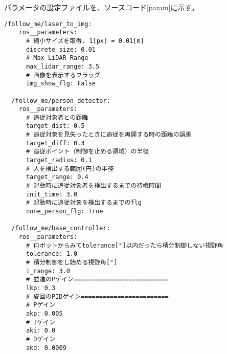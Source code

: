 パラメータの設定ファイルを、ソースコード\ref{param}に示す。
\begin{lstlisting}[caption=follow\_me\_params.yaml, label=param]
  /follow_me/laser_to_img:
    ros__parameters:
      # 縮小サイズを取得. 1[px] = 0.01[m]
      discrete_size: 0.01
      # Max LiDAR Range
      max_lidar_range: 3.5
      # 画像を表示するフラッグ
      img_show_flg: False
  
  /follow_me/person_detector:
    ros__parameters:
      # 追従対象者との距離
      target_dist: 0.5
      # 追従対象を見失ったときに追従を再開する時の距離の誤差
      target_diff: 0.3
      # 追従ポイント（制御を止める領域）の半径
      target_radius: 0.1
      # 人を検出する範囲(円)の半径
      target_range: 0.4
      # 起動時に追従対象者を検出するまでの待機時間
      init_time: 3.0
      # 起動時に追従対象を検出するまでのflg
      none_person_flg: True
    
  /follow_me/base_controller:
    ros__parameters:
      # ロボットからみてtolerance[°]以内だったら積分制御しない視野角
      tolerance: 1.0
      # 積分制御をし始める視野角[°]
      i_range: 3.0
      # 並進のPゲイン==========================
      lkp: 0.3
      # 旋回のPIDゲイン========================
      # Pゲイン
      akp: 0.005
      # Iゲイン
      aki: 0.0
      # Dゲイン
      akd: 0.0009
\end{lstlisting}

